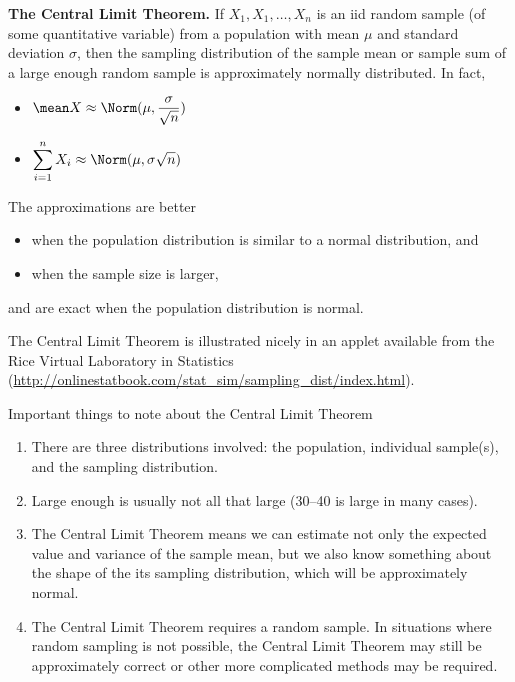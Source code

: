 \documentclass[twoside]{book}\usepackage[]{graphicx}\usepackage[]{xcolor}
\newlength{\tempfmlength}
\newenvironment{fmpage}[1]
     {
	 \medskip
	 \setlength{\tempfmlength}{#1}
	 \begin{lrbox}{\fmbox}
	   \begin{minipage}{#1}
		 \vspace*{.02\tempfmlength}
		 \hfill
	   \begin{minipage}{.95 \tempfmlength}}
		 {\end{minipage}\hfill
		 \vspace*{.015\tempfmlength}
		 \end{minipage}\end{lrbox}\fbox{\usebox{\fmbox}}
	 \medskip
	 }
\newenvironment{boxedText}[1][.98\textwidth]%
{%
\begin{center}
\begin{fmpage}{#1}
}%
{%
\end{fmpage}
\end{center}
}
\begin{document}
\begin{boxedText}
{\sf \bfseries The Central Limit Theorem.}
If $X_1, X_1, \dots, X_n$ is an iid random sample (of some quantitative variable) 
from a population with mean $\mu$ and standard deviation $\sigma$,
then the sampling distribution of the sample mean or sample sum 
of a large enough random sample is approximately normally distributed.  In fact,
\medskip

\begin{itemize}
\item $\displaystyle \mean X \approx \Norm(\mu, \frac{\sigma}{\sqrt{n}}) $
\item $\displaystyle \sum_{i=1}^{n} X_i \approx \Norm(\mu, {\sigma}{\sqrt{n}}) $
\end{itemize}
\medskip

The approximations are better 
\begin{itemize}
\item
when the population distribution is similar to a normal distribution, and 
\item
when the sample size is larger,
\end{itemize}
and are exact when the population distribution is normal.

\medskip
The Central Limit Theorem is illustrated nicely in an applet available 
from the Rice Virtual Laboratory in Statistics
(\url{http://onlinestatbook.com/stat_sim/sampling_dist/index.html}).
\end{boxedText}

Important things to note about the Central Limit Theorem
\begin{enumerate}
	\item
		There are three distributions involved: the population, individual sample(s),
		and the sampling distribution.
	\item
		Large enough is usually not all that large (30--40 is large in many cases).
	\item
		The Central Limit Theorem means we can estimate not only the expected value and variance of the sample mean, but we also know something about the
		shape of the its sampling distribution, which will be approximately normal.
	\item
		The Central Limit Theorem requires a random sample.  In situations where
		random sampling is not possible, the Central Limit Theorem may still be 
		approximately correct or other more complicated methods may be required.
\end{enumerate}
\end{document}
